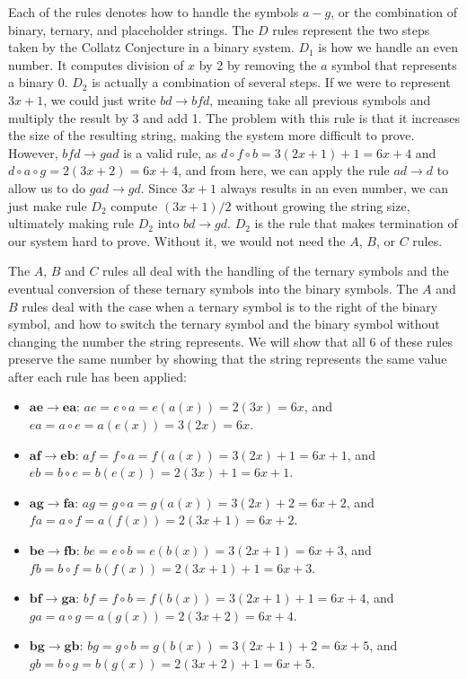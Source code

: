 Each of the rules denotes how to handle the symbols $a-g$, or the combination of binary, ternary, and placeholder strings. The $D$ rules represent the two steps taken by the Collatz Conjecture in a binary system. $D_1$ is how we handle an even number. It computes division of $x$ by 2 by removing the $a$ symbol that represents a binary 0. $D_2$ is actually a combination of several steps. If we were to represent $3x+1$, we could just write $bd \rightarrow bfd$, meaning take all previous symbols and multiply the result by 3 and add 1. The problem with this rule is that it increases the size of the resulting string, making the system more difficult to prove. However, $bfd \rightarrow gad$ is a valid rule,  as $d \circ f \circ b = 3(2x+1)+1 = 6x+4$ and $d \circ a \circ g = 2(3x+2) = 6x+4$, and from here, we can apply the rule $ad \rightarrow d$ to allow us to do $gad \rightarrow gd$. Since $3x+1$ always results in an even number, we can just make rule $D_2$ compute $(3x+1)/2$ without growing the string size, ultimately making rule $D_2$ into $bd \rightarrow gd$. $D_2$ is the rule that makes termination of our system hard to prove. Without it, we would not need the $A$, $B$, or $C$ rules.\par
The $A$, $B$ and $C$ rules all deal with the handling of the ternary symbols and the eventual conversion of these ternary symbols into the binary symbols. The $A$ and $B$ rules deal with the case when a ternary symbol is to the right of the binary symbol, and how to switch the ternary symbol and the binary symbol without changing the number the string represents. We will show that all 6 of these rules preserve the same number by showing that the string represents the same value after each rule has been applied:
\begin{itemize}
    \item $\boldsymbol{ae \rightarrow ea}$: $ae = e \circ a = e(a(x)) = 2(3x) = 6x$, and $ea = a
    \circ e = a(e(x)) = 3(2x) = 6x$.
    \item $\boldsymbol{af \rightarrow eb}$: $af = f \circ a = f(a(x)) = 3(2x)+1 = 6x+1$, and $eb =
    b \circ e = b(e(x)) = 2(3x)+1 = 6x+1$.
    \item $\boldsymbol{ag \rightarrow fa}$: $ag = g \circ a = g(a(x)) = 3(2x)+2 = 6x+2$, and $fa = a \circ f = a(f(x)) = 2(3x+1) = 6x+2$.
    \item $\boldsymbol{be \rightarrow fb}$: $be = e \circ b = e(b(x)) = 3(2x+1) = 6x+3$, and $fb = b \circ f = b(f(x)) = 2(3x+1)+1 = 6x+3$.
    \item $\boldsymbol{bf \rightarrow ga}$: $bf = f \circ b = f(b(x)) = 3(2x+1)+1 = 6x+4$, and $ga =  a \circ g = a(g(x)) = 2(3x+2) = 6x+4$.
    \item $\boldsymbol{bg \rightarrow gb}$: $bg = g \circ b = g(b(x)) = 3(2x+1)+2 = 6x+5$, and $gb = b \circ g = b(g(x)) = 2(3x+2)+1 = 6x+5$.
\end{itemize}
